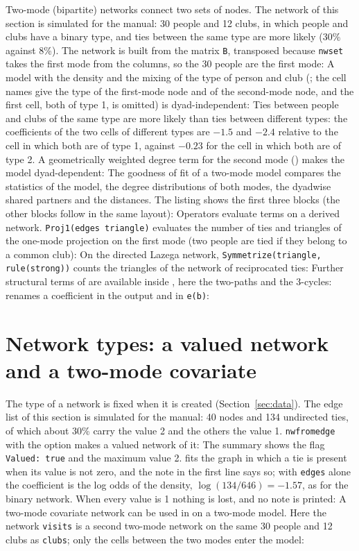 Two-mode (bipartite) networks connect two sets of nodes. The network of this section is simulated for the manual: 30 people and 12 clubs, in which people and clubs have a binary type, and ties between the same type are more likely (30\% against 8\%). The network is built from the matrix \texttt{B}, transposed because \texttt{nwset} takes the first mode from the columns, so the 30 people are the first mode:
A model with the density and the mixing of the type of person and club (; the cell names give the type of the first-mode node and of the second-mode node, and the first cell, both of type 1, is omitted) is dyad-independent:
Ties between people and clubs of the same type are more likely than ties between different types: the coefficients of the two cells of different types are $-1.5$ and $-2.4$ relative to the cell in which both are of type 1, against $-0.23$ for the cell in which both are of type 2. A geometrically weighted degree term for the second mode () makes the model dyad-dependent:
The goodness of fit of a two-mode model compares the statistics of the model, the degree distributions of both modes, the dyadwise shared partners and the distances. The listing shows the first three blocks (the other blocks follow in the same layout):
Operators evaluate terms on a derived network. \texttt{Proj1(edges triangle)} evaluates the number of ties and triangles of the one-mode projection on the first mode (two people are tied if they belong to a common club):
On the directed Lazega network, \texttt{Symmetrize(triangle, rule(strong))} counts the triangles of the network of reciprocated ties:
Further structural terms of \ergm{} are available inside , here the two-paths and the 3-cycles:
 renames a coefficient in the output and in \texttt{e(b)}:

\section{Network types: a valued network and a two-mode covariate}\label{sec:types}

The type of a network is fixed when it is created (Section~\ref{sec:data}). The edge list of this section is simulated for the manual: 40 nodes and 134 undirected ties, of which about 30\% carry the value 2 and the others the value 1. \texttt{nwfromedge} with the option  makes a valued network of it:
The summary shows the flag \texttt{Valued: true} and the maximum value 2. \nwergm{} fits the graph in which a tie is present when its value is not zero, and the note in the first line says so; with \texttt{edges} alone the coefficient is the log odds of the density, $\log(134/646)=-1.57$, as for the binary network. When every value is 1 nothing is lost, and no note is printed:
A two-mode covariate network can be used in  on a two-mode model. Here the network \texttt{visits} is a second two-mode network on the same 30 people and 12 clubs as \texttt{clubs}; only the cells between the two modes enter the model:
